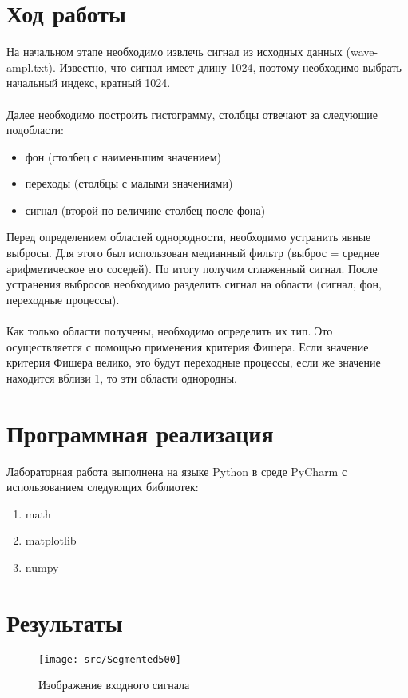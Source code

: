 \documentclass[a4paper]{article}
\begin{document}
\section{Ход работы}
\noindent На начальном этапе необходимо извлечь сигнал из исходных данных
(wave-ampl.txt).
Известно, что сигнал имеет длину 1024, поэтому необходимо
выбрать начальный индекс, кратный 1024.\\\\
\noindent Далее необходимо построить гистограмму, столбцы отвечают за
следующие подобласти:
\begin{itemize}
    \item фон (столбец с наименьшим значением)
    \item переходы (столбцы с малыми значениями)
    \item сигнал (второй по величине столбец после фона)
\end{itemize}
\noindent Перед определением областей однородности, необходимо устранить
явные выбросы.
Для этого был использован медианный фильтр (выброс =
среднее арифметическое его соседей).
По итогу получим сглаженный сигнал.
После устранения выбросов необходимо разделить сигнал на области
(сигнал, фон, переходные процессы). \\\\
\noindent Как только области получены, необходимо определить их тип.
Это
осуществляется с помощью применения критерия Фишера.
Если значение
критерия Фишера велико, это будут переходные процессы, если же значение
находится вблизи 1, то эти области однородны.

\section{Программная реализация}
\noindent Лабораторная работа выполнена на языке Python в среде PyCharm с использованием следующих библиотек:
 \begin{enumerate}
        \item math
        \item matplotlib
        \item numpy
 \end{enumerate}

\section{Результаты}
	\begin{figure}[H]
		\centering
		\texttt{[image: src/Segmented500]}
		\caption{Изображение входного сигнала}
		\label{fig:signal}
	\end{figure}
\end{document}
